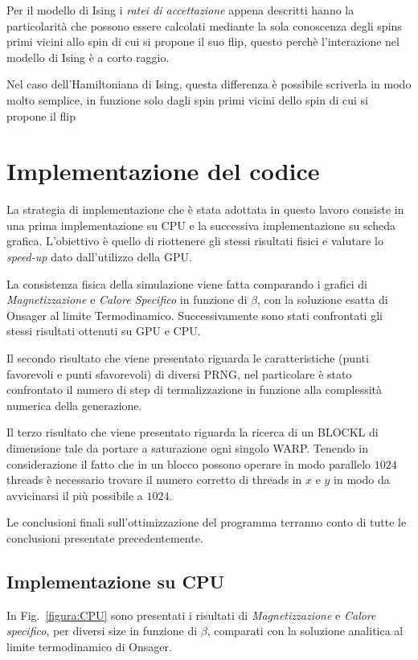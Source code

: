 \documentclass[a4paper,12pt]{article}
\begin{document}
Per il modello di Ising i \emph{ratei di accettazione} appena descritti hanno la particolarit\`a che possono essere calcolati mediante la sola conoscenza degli spins primi vicini allo spin di cui si propone il suo flip, questo perchè l'interazione nel modello di Ising  è a corto raggio. 

Nel caso dell'Hamiltoniana di Ising, questa differenza è possibile scriverla in modo molto semplice, in funzione solo dagli spin primi vicini dello spin di cui si propone il flip



\section{Implementazione del codice}
La strategia di implementazione che \`e stata adottata in questo lavoro consiste in una prima implementazione su CPU e la successiva implementazione su scheda grafica. L'obiettivo \`e quello di riottenere gli stessi risultati fisici e valutare lo \emph{speed-up} dato dall'utilizzo della GPU. 

La consistenza fisica della simulazione viene fatta comparando i grafici di \emph{Magnetizzazione} e \emph{Calore Specifico} in funzione di $\beta$, con la soluzione esatta di Onsager al limite Termodinamico. Successivamente sono stati confrontati gli stessi risultati ottenuti su GPU e CPU. 

Il secondo risultato che viene presentato riguarda le caratteristiche (punti favorevoli e punti sfavorevoli) di diversi PRNG, nel particolare \`e stato confrontato il numero di step di termalizzazione in funzione alla complessit\`a numerica della generazione. 

Il terzo risultato che viene presentato riguarda la ricerca di un BLOCKL di dimensione tale da portare a saturazione ogni singolo WARP. Tenendo in considerazione il fatto che in un blocco possono operare in modo parallelo $1024$ threads \`e necessario trovare il numero corretto di threads in $x$ e $y$ in modo da avvicinarsi il pi\`u possibile a $1024$.

Le conclusioni finali sull'ottimizzazione del programma terranno conto di tutte le conclusioni presentate precedentemente.

\subsection{Implementazione su CPU}
In Fig.~\ref{figura:CPU} sono presentati i risultati di \emph{Magnetizzazione} e \emph{Calore specifico}, per diversi size in funzione di $\beta$, comparati con la soluzione analitica al limite termodinamico di Onsager.
\end{document}
